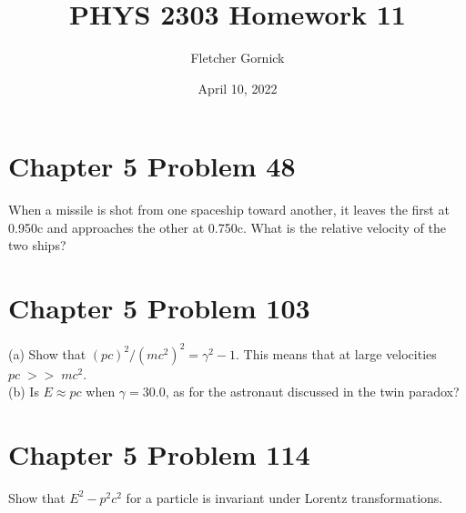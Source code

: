 \documentclass[11pt]{article}
\title{\vspace{-1.0cm}PHYS 2303 Homework 11}
\author{Fletcher Gornick}
\date{April 10, 2022}
\begin{document}
 \maketitle

 \section*{Chapter 5 Problem 48}
 When a missile is shot from one spaceship toward another, it leaves the first at 0.950c 
 and approaches the other at 0.750c. What is the relative velocity of the two ships?
 \newpage

 \section*{Chapter 5 Problem 103}
 (a) Show that \((pc)^2 / (mc^2)^2 = \gamma^2 - 1\). This means that at large velocities
 \(pc \;>>\; mc^2\). \\
 (b) Is \(E \approx pc\) when \(\gamma = 30.0\), as for the astronaut discussed in the twin
paradox?
 \newpage

 \section*{Chapter 5 Problem 114}
 Show that \(E^2 - p^2c^2\) for a particle is invariant under Lorentz transformations.
\end{document}
